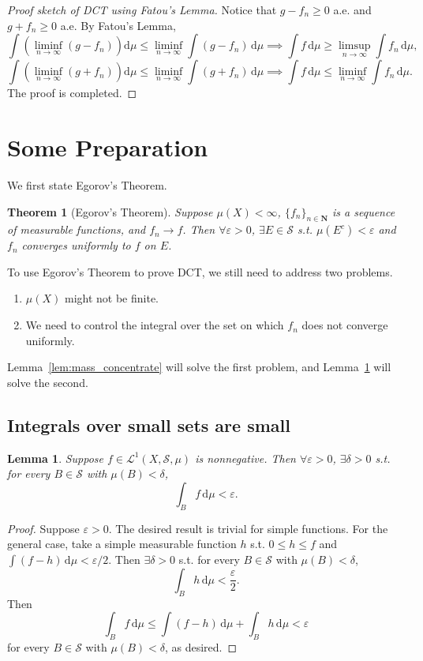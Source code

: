 \documentclass[11pt,a4paper]{article}
\theoremstyle{plain} %
\newtheorem*{theorem}{Theorem}
\newtheorem{lemma}[thm]{Lemma}
\theoremstyle{definition}
\theoremstyle{remark}
\newcommand{\bra}[1]{\mathopen{}\left(#1\right)}
\newcommand{\N}{\mathbf{N}}
\renewcommand{\d}{\mathrm{d}}
\newcommand{\eps}{\varepsilon}
\renewcommand{\L}{\mathcal{L}}
\renewcommand{\S}{\mathcal{S}}
\newcommand{\nti}{n\to\infty}
\begin{document}
\begin{proof}[Proof sketch of DCT using Fatou's Lemma]
    Notice that $g-f_n\ge0$ a.e. and $g+f_n\ge0$ a.e. By Fatou's Lemma,
    \[\int\bra{\liminf_{\nti}(g-f_n)}\d\mu\le\liminf_{\nti}\int (g-f_n)\,\d\mu \implies \int f\,\d\mu\ge\limsup_{\nti}\int f_n\,\d\mu,\]
    \[\int\bra{\liminf_{\nti}(g+f_n)}\d\mu\le\liminf_{\nti}\int (g+f_n)\,\d\mu \implies \int f\,\d\mu\le\liminf_{\nti}\int f_n\,\d\mu.\]
    The proof is completed.
\end{proof}

\section{Some Preparation}
We first state Egorov's Theorem.

\begin{theorem}[Egorov's Theorem]
    Suppose $\mu(X)<\infty$, $\{f_n\}_{n\in\N}$ is a sequence of measurable functions, and $f_n\to f$. Then $\forall\eps>0$, $\exists E\in\S$ s.t. $\mu(E^c)<\eps$ and $f_n$ converges uniformly to $f$ on $E$.
\end{theorem}

To use Egorov's Theorem to prove DCT, we still need to address two problems.
\begin{enumerate}
    \item $\mu(X)$ might not be finite.
    \item We need to control the integral over the set on which $f_n$ does not converge uniformly.
\end{enumerate}
Lemma~\ref{lem:mass_concentrate} will solve the first problem, and Lemma~\ref{lem:small_area} will solve the second.

\subsection{Integrals over small sets are small}
\begin{lemma}\label{lem:small_area}
    Suppose $f\in\L^1(X,\S,\mu)$ is nonnegative. Then $\forall\eps>0$, $\exists\delta>0$ s.t. for every $B\in\S$ with $\mu(B)<\delta$,
    \[\int_Bf\,\d\mu<\eps.\]
\end{lemma}

\begin{proof}
    Suppose $\eps>0$. The desired result is trivial for simple functions. For the general case, take a simple measurable function $h$ s.t. $0\le h\le f$ and $\int(f-h)\,\d\mu<\eps/2$. Then $\exists\delta>0$ s.t. for every $B\in\S$ with $\mu(B)<\delta$,
    \[\int_Bh\,\d\mu<\frac\eps2.\]
    Then
    \[\int_Bf\,\d\mu\le\int(f-h)\,\d\mu+\int_Bh\,\d\mu<\eps\]
    for every $B\in\S$ with $\mu(B)<\delta$, as desired.
\end{proof}
\end{document}
